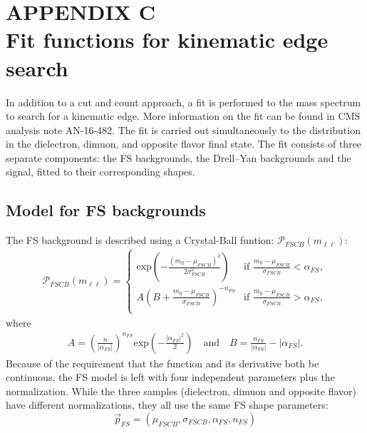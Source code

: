 \appendix %
\chapter*{APPENDIX C\\ Fit functions for kinematic edge search} %
\noindent\justify
{}
\setcounter{chapter}{1}
\label{sec:edgeFit}
\noindent\justify
In addition to a cut and count approach, a fit is performed to the mass spectrum to search for a kinematic edge. 
More information on the fit can be found in CMS analysis note AN-16-482. 
The fit is carried out simultaneously to the \mll distribution in the dielectron, dimuon, and opposite flavor final state. 
The fit consists of three separate components: the FS backgrounds, the Drell--Yan backgrounds and the signal, fitted to their corresponding shapes. 
\section*{Model for FS backgrounds}
\noindent\justify
The FS background is described using a Crystal-Ball funtion:
$\mathcal{P}_{FSCB}(m_{\ell\ell})$: 
\begin{eqnarray}
\mathcal{P}_{FSCB}(m_{\ell\ell}) = \begin{cases} 
\textrm{exp}\left(-\frac{(m_{ll}-\mu_{FSCB})^2}{2\sigma_{FSCB}^2}\right) &\mbox{if } \frac{m_{ll}-\mu_{FSCB}}{\sigma_{FSCB}}<\alpha_{FS}, \\
A (B+\frac{m_{ll}-\mu_{FSCB}}{\sigma_{FSCB}})^{-n_{FS}} &\mbox{if } \frac{m_{ll}-\mu_{FSCB}}{\sigma_{FSCB}}>\alpha_{FS}, \\
\end{cases}
\end{eqnarray}
where
\begin{eqnarray}
A = \left(\frac{n}{|\alpha_{FS}|}\right)^{n_{FS}} \textrm{exp}\left(-\frac{|\alpha_{FS}|^2}{2}\right) \quad \textrm{and}\quad B = \frac{n_{FS}}{|\alpha_{FS}|}-|\alpha_{FS}| .
\end{eqnarray}
Because of the requirement that the function and its derivative both be continuous, the FS model is left with four independent parameters plus the normalization.
While the three samples (dielectron, dimuon and opposite flavor) have different normalizations, they all use the same FS shape parameters: 
\begin{equation*}
\vec{p}_{FS} = (\mu_{FSCB},\sigma_{FSCB},\alpha_{FS},n_{FS})
\end{equation*}
